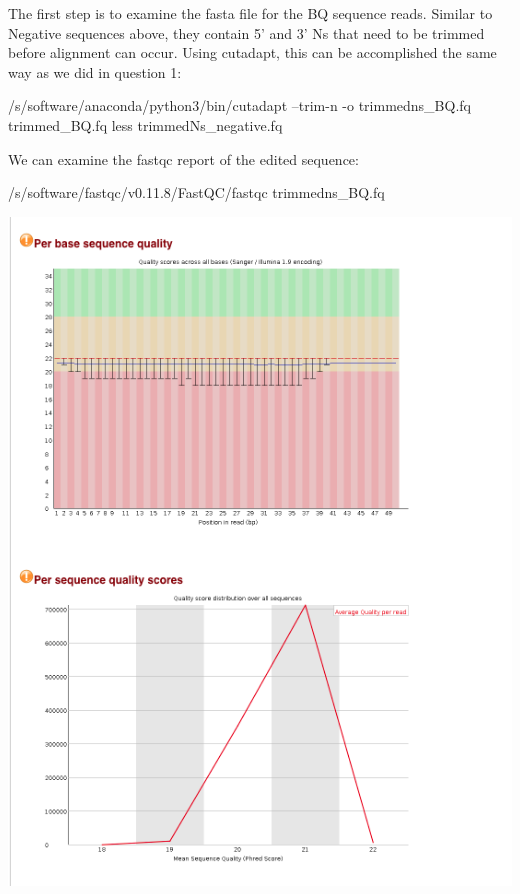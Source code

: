 \documentclass[12pt,]{article}
\newenvironment{Shaded}{\begin{snugshade}}{\end{snugshade}}
\newcommand{\FunctionTok}[1]{\textcolor[rgb]{0.00,0.00,0.00}{#1}}
\newcommand{\ExtensionTok}[1]{#1}
\newcommand{\NormalTok}[1]{#1}
\begin{document}
The first step is to examine the fasta file for the BQ sequence reads.
Similar to Negative sequences above, they contain 5' and 3' Ns that need
to be trimmed before alignment can occur. Using cutadapt, this can be
accomplished the same way as we did in question 1:

\begin{Shaded}
\begin{Highlighting}[]
\ExtensionTok{/s/software/anaconda/python3/bin/cutadapt}\NormalTok{ --trim-n -o trimmedns_BQ.fq trimmed_BQ.fq}
\FunctionTok{less}\NormalTok{ trimmedNs_negative.fq}
\end{Highlighting}
\end{Shaded}

We can examine the fastqc report of the edited sequence:

\begin{Shaded}
\begin{Highlighting}[]
\ExtensionTok{/s/software/fastqc/v0.11.8/FastQC/fastqc}\NormalTok{ trimmedns_BQ.fq}
\end{Highlighting}
\end{Shaded}

\includegraphics{trimmedns_BQ_fastqc.png}\\
\end{document}
